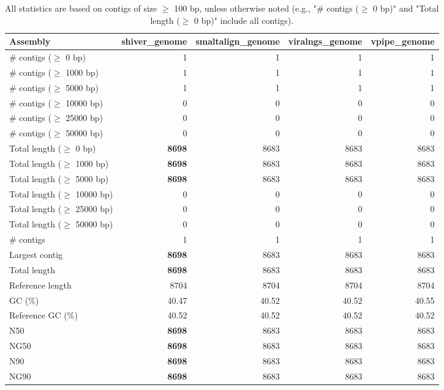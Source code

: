 \documentclass[12pt,a4paper]{article}
\begin{document}
\begin{table}[ht]
\begin{center}
\caption{All statistics are based on contigs of size $\geq$ 100 bp, unless otherwise noted (e.g., "\# contigs ($\geq$ 0 bp)" and "Total length ($\geq$ 0 bp)" include all contigs).}
\begin{tabular}{|l*{4}{|r}|}
\hline
Assembly & shiver\_genome & smaltalign\_genome & viralngs\_genome & vpipe\_genome \\ \hline
\# contigs ($\geq$ 0 bp) & 1 & 1 & 1 & 1 \\ \hline
\# contigs ($\geq$ 1000 bp) & 1 & 1 & 1 & 1 \\ \hline
\# contigs ($\geq$ 5000 bp) & 1 & 1 & 1 & 1 \\ \hline
\# contigs ($\geq$ 10000 bp) & 0 & 0 & 0 & 0 \\ \hline
\# contigs ($\geq$ 25000 bp) & 0 & 0 & 0 & 0 \\ \hline
\# contigs ($\geq$ 50000 bp) & 0 & 0 & 0 & 0 \\ \hline
Total length ($\geq$ 0 bp) & {\bf 8698} & 8683 & 8683 & 8683 \\ \hline
Total length ($\geq$ 1000 bp) & {\bf 8698} & 8683 & 8683 & 8683 \\ \hline
Total length ($\geq$ 5000 bp) & {\bf 8698} & 8683 & 8683 & 8683 \\ \hline
Total length ($\geq$ 10000 bp) & 0 & 0 & 0 & 0 \\ \hline
Total length ($\geq$ 25000 bp) & 0 & 0 & 0 & 0 \\ \hline
Total length ($\geq$ 50000 bp) & 0 & 0 & 0 & 0 \\ \hline
\# contigs & 1 & 1 & 1 & 1 \\ \hline
Largest contig & {\bf 8698} & 8683 & 8683 & 8683 \\ \hline
Total length & {\bf 8698} & 8683 & 8683 & 8683 \\ \hline
Reference length & 8704 & 8704 & 8704 & 8704 \\ \hline
GC (\%) & 40.47 & 40.52 & 40.52 & 40.55 \\ \hline
Reference GC (\%) & 40.52 & 40.52 & 40.52 & 40.52 \\ \hline
N50 & {\bf 8698} & 8683 & 8683 & 8683 \\ \hline
NG50 & {\bf 8698} & 8683 & 8683 & 8683 \\ \hline
N90 & {\bf 8698} & 8683 & 8683 & 8683 \\ \hline
NG90 & {\bf 8698} & 8683 & 8683 & 8683 \\ \hline

\end{tabular}
\end{center}
\end{table}
\end{document}
